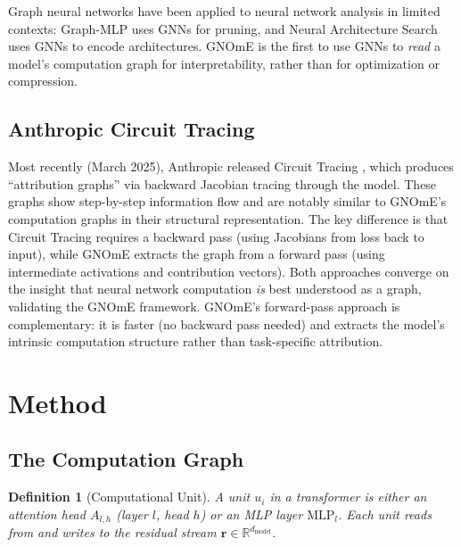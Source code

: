 \documentclass[11pt,a4paper]{article}
\newtheorem{definition}[theorem]{Definition}
\begin{document}
Graph neural networks \cite{scarselli2009graph,kipf2017semi,velickovic2018gat,xu2019powerful} have been applied to neural network analysis in limited contexts: Graph-MLP \cite{fey2021hierarchical} uses GNNs for pruning, and Neural Architecture Search \cite{ying2019nas} uses GNNs to encode architectures. GNOmE is the first to use GNNs to \emph{read} a model's computation graph for interpretability, rather than for optimization or compression.

\subsection{Anthropic Circuit Tracing}

Most recently (March 2025), Anthropic released Circuit Tracing \cite{anthropic2025circuit}, which produces ``attribution graphs'' via backward Jacobian tracing through the model. These graphs show step-by-step information flow and are notably similar to GNOmE's computation graphs in their structural representation. The key difference is that Circuit Tracing requires a backward pass (using Jacobians from loss back to input), while GNOmE extracts the graph from a forward pass (using intermediate activations and contribution vectors). Both approaches converge on the insight that neural network computation \emph{is} best understood as a graph, validating the GNOmE framework. GNOmE's forward-pass approach is complementary: it is faster (no backward pass needed) and extracts the model's intrinsic computation structure rather than task-specific attribution.

\section{Method}

\subsection{The Computation Graph}

\begin{definition}[Computational Unit]
A \emph{unit} $u_i$ in a transformer is either an attention head $A_{l,h}$ (layer $l$, head $h$) or an MLP layer $\text{MLP}_l$. Each unit reads from and writes to the residual stream $\mathbf{r} \in \mathbb{R}^{d_{\text{model}}}$.
\end{definition}
\end{document}
